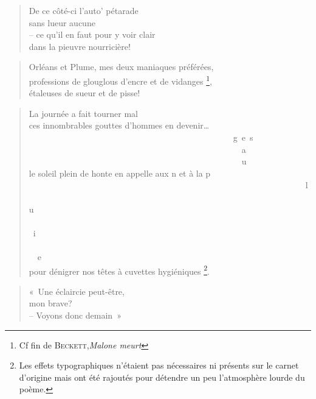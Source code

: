   \begin{verse}
    De ce côté-ci l’auto’ pétarade\\
    sans lueur aucune\\
    -- ce qu’il en faut pour y voir clair\\
    dans la pieuvre nourricière!
  \end{verse}
  \begin{verse}
    Orléans et Plume, mes deux maniaques préférées,\\
    professions de glouglous d’encre et de vidanges
    \footnote{
	    Cf fin de \textsc{Beckett},\emph{Malone meurt}},\\
    étaleuses de sueur et de pisse!
  \end{verse}
  \begin{verse}
    La journée a fait tourner mal\\
    ces innombrables gouttes d’hommes en devenir…\\
    ~~~~~~~~~~~~~~~~~~~~~~~~~~~~~~~~~~~~~~~~~~~~~~~~g~e~s\\
    ~~~~~~~~~~~~~~~~~~~~~~~~~~~~~~~~~~~~~~~~~~~~~~~~~~a\\
    ~~~~~~~~~~~~~~~~~~~~~~~~~~~~~~~~~~~~~~~~~~~~~~~~~~u\\
    le soleil plein de honte en appelle aux n et à la p\\
    ~~~~~~~~~~~~~~~~~~~~~~~~~~~~~~~~~~~~~~~~~~~~~~~~~~~~~~~~~~~~~~~~~l\\
    ~~~~~~~~~~~~~~~~~~~~~~~~~~~~~~~~~~~~~~~~~~~~~~~~~~~~~~~~~~~~~~~~~~u\\
    ~~~~~~~~~~~~~~~~~~~~~~~~~~~~~~~~~~~~~~~~~~~~~~~~~~~~~~~~~~~~~~~~~~~i\\
    ~~~~~~~~~~~~~~~~~~~~~~~~~~~~~~~~~~~~~~~~~~~~~~~~~~~~~~~~~~~~~~~~~~~~e\\
    pour dénigrer nos têtes à cuvettes hygiéniques
    \footnote{
	    Les effets typographiques n’étaient pas nécessaires ni présents sur le carnet
	    d’origine mais ont été rajoutés pour détendre un peu l’atmosphère lourde du poème.}.
  \end{verse}
  \begin{verse}
    «~Une éclaircie peut-être,\\
    mon brave?\\
    -- Voyons donc demain~»
  \end{verse}

